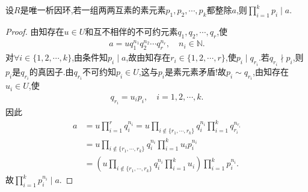 \documentclass[../../main.tex]{subfiles}%
\begin{document}
\begin{proposition}\label{proposition:UFD中互素元素整除同一元素则乘积也整除这个元素}
设$R$是唯一析因环,若一组两两互素的素元素$p_1,p_2,\cdots,p_k$都整除$a$,则$\prod_{i=1}^k{p_i}\mid a.$
\end{proposition}
\begin{proof}

由知存在$u\in U$和互不相伴的不可约元素$q_1,q_2,\cdots,q_r$,使
\begin{align*}
a=uq_1^{n_1}q_2^{n_2}\cdots q_r^{n_r},\quad n_i\in \mathbb{N}.
\end{align*}
对$\forall i\in \{1,2,\cdots,k\}$,由条件知$p_i\mid a$,故由知存在$r_i\in \{1,2,\cdots,r\}$,使$p_i\mid q_{r_i}$.若$q_{r_i}\nmid p_i$,则$p_i$是$q_{r_i}$的真因子.由$q_{r_i}$不可约知$p_i\in U$,这与$p_i$是素元素矛盾!故$p_i\sim q_{r_i}$,由知存在$u_i\in U$,使
\begin{align*}
q_{r_i}=u_ip_i,\quad i=1,2,\cdots,k.
\end{align*}
因此
\begin{align*}
a&=u\prod_{i=1}^r q_i^{n_i}=u\prod_{i\notin \{r_1,\cdots,r_k\}} q_i^{n_i}\prod_{i=1}^k q_{r_i}^{n_{r_i}} \\
&=u\prod_{i\notin \{r_1,\cdots,r_k\}} q_i^{n_i}\prod_{i=1}^k u_ip_i^{n_i} \\
&=\left( u\prod_{i\notin \{r_1,\cdots,r_k\}} q_i^{n_i}\prod_{i=1}^k u_i \right) \prod_{i=1}^k p_i^{n_i}.
\end{align*}
故$\prod_{i=1}^k p_i^{n_i}\mid a$.

\end{proof}
\end{document}
